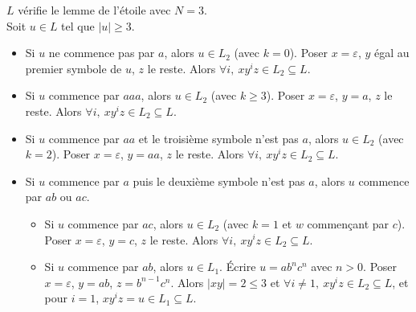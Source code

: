 \begin{corrections}
\begin{questions}
  \item $L$ vérifie le lemme de l'étoile avec $N=3$.\\
    Soit $u\in L$ tel que $|u|\ge 3$.
    \begin{itemize}
    \item Si $u$ ne commence pas par $a$, alors $u\in L_2$ (avec $k=0$). Poser $x=\varepsilon$, $y$ égal au premier symbole de $u$, $z$ le reste. Alors $\forall i,\ xy^iz\in L_2\subseteq L$.
    \item Si $u$ commence par $aaa$, alors $u\in L_2$ (avec $k\ge 3$). Poser $x=\varepsilon$, $y=a$, $z$ le reste. Alors $\forall i,\ xy^iz\in L_2\subseteq L$.
    \item Si $u$ commence par $aa$ et le troisième symbole n'est pas $a$, alors $u\in L_2$ (avec $k=2$). Poser $x=\varepsilon$, $y=aa$, $z$ le reste. Alors $\forall i,\ xy^iz\in L_2\subseteq L$.
    \item Si $u$ commence par $a$ puis le deuxième symbole n'est pas $a$, alors $u$ commence par $ab$ ou $ac$.
      \begin{itemize}
      \item Si $u$ commence par $ac$, alors $u\in L_2$ (avec $k=1$ et $w$ commençant par $c$). Poser $x=\varepsilon$, $y=c$, $z$ le reste. Alors $\forall i,\ xy^iz\in L_2\subseteq L$.
      \item Si $u$ commence par $ab$, alors $u\in L_1$. Écrire $u = ab^n c^n$ avec $n>0$.
        Poser $x=\varepsilon$, $y=ab$, $z=b^{n-1}c^n$. Alors $|xy|=2\le 3$ et $\forall i\neq 1,\ xy^iz\in L_2\subseteq L$, et pour $i=1$, $xy^iz=u\in L_1\subseteq L$.
      \end{itemize}
    \end{itemize}

  \end{questions}

\end{corrections}

\endgroup
\endinput

